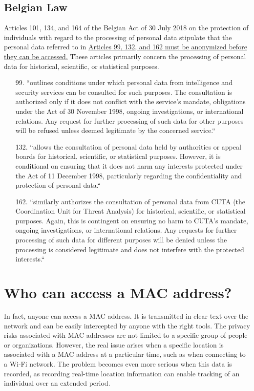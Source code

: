 \documentclass{article}
\begin{document}
  \subsection{\label{subsec:BEL}Belgian Law}

  Articles 101, 134, and 164 of the Belgian Act of 30 July 2018 on the protection
  of individuals with regard to the processing of personal data
  stipulate that the personal data referred to in
  \ul{Articles 99, 132, and 162 must be anonymized before they can be accessed.} 
  These articles primarily concern the processing of personal data for historical, 
  scientific, or statistical purposes.

    \begin{enumerate}
    \item[99.] ``outlines conditions under which personal data from intelligence 
    and security services can be consulted for such purposes. The consultation 
    is authorized only if it does not conflict with the service’s mandate, obligations 
    under the Act of 30 November 1998, ongoing investigations, or international relations. 
    Any request for further processing of such data for other purposes will be refused 
    unless deemed legitimate by the concerned service.``

    \item[132.] ``allows the consultation of personal data held by authorities or 
    appeal boards for historical, scientific, or statistical purposes. However, 
    it is conditional on ensuring that it does not harm any interests protected 
    under the Act of 11 December 1998, particularly regarding the confidentiality 
    and protection of personal data.``

    \item[162.] ``similarly authorizes the consultation of personal data from CUTA 
    (the Coordination Unit for Threat Analysis) for historical, scientific, or 
    statistical purposes. Again, this is contingent on ensuring no harm to CUTA’s 
    mandate, ongoing investigations, or international relations. Any requests for 
    further processing of such data for different purposes will be denied unless 
    the processing is considered legitimate and does not interfere with the 
    protected interests.``
    \end{enumerate}
  \cite{BelgianAct2018}

\section{\label{sec:Who}Who can access a MAC address?}
  In fact, anyone can access a MAC address. It is transmitted in clear text over 
  the network and can be easily intercepted by anyone with the right tools. The privacy risks associated
  with MAC addresses are not limited to a specific group of people or organizations.
  However, the real issue arises when a specific location is associated with a 
  MAC address at a particular time, such as when connecting to a Wi-Fi network. 
  The problem becomes even more serious when this data is recorded, as recording 
  real-time location information can enable tracking of an individual over an 
  extended period.
\end{document}
